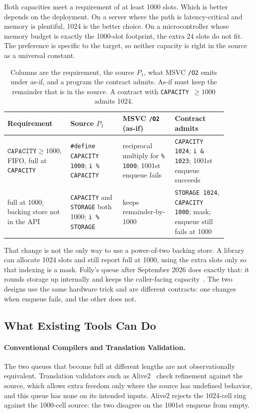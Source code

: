 Both capacities meet a requirement of at least 1000 slots. Which is better
depends on the deployment. On a server where the path is latency-critical and
memory is plentiful, 1024 is the better choice. On a microcontroller whose
memory budget is exactly the 1000-slot footprint, the extra 24 slots do not
fit. The preference is specific to the target, so neither capacity is right
in the source as a universal constant.

\begin{table}
\caption{Columns are the requirement, the source \(P_1\), what MSVC
\texttt{/O2} emits under as-if, and a program the contract admits. As-if
must keep the remainder that is in the source. A contract with
\texttt{CAPACITY}~\(\ge 1000\) admits 1024.}
\label{tab:motivating}
\scriptsize
\begin{tabular}{p{0.22\linewidth}p{0.22\linewidth}p{0.22\linewidth}p{0.22\linewidth}}
\toprule
Requirement & Source \(P_1\) & MSVC \texttt{/O2} (as-if) & Contract admits \\
\midrule
\(\texttt{CAPACITY} \ge 1000\), FIFO, full at \texttt{CAPACITY} &
\texttt{\#define CAPACITY 1000}; \texttt{i \% CAPACITY} &
reciprocal multiply for \texttt{\% 1000}; 1001st enqueue fails &
\texttt{CAPACITY 1024}; \texttt{i \& 1023}; 1001st enqueue succeeds \\
full at 1000; backing store not in the API &
\texttt{CAPACITY} and \texttt{STORAGE} both 1000; \texttt{i \% STORAGE} &
keeps remainder-by-1000 &
\texttt{STORAGE 1024}, \texttt{CAPACITY 1000}; mask; enqueue still fails at 1000 \\
\bottomrule
\end{tabular}
\end{table}

That change is not the only way to use a power-of-two backing store. A library
can allocate 1024 slots and still report full at 1000, using the extra slots
only so that indexing is a mask. Folly's queue after September 2026 does
exactly that: it rounds storage up internally and keeps the caller-facing
capacity~\cite{folly_pcq}. The two designs use the same hardware trick and are different contracts: one
changes when enqueue fails, and the other does not.

\subsection{What Existing Tools Can Do}
\label{sec:existing}

\paragraph{Conventional Compilers and Translation Validation.}
The two queues that become full at different lengths are not observationally
equivalent. Translation validators such as Alive2~\cite{lopes2021alive2} check
refinement against the source, which allows extra freedom only where the source
has undefined behavior, and this queue has none on its intended inputs.
Alive2 rejects the 1024-cell ring against the 1000-cell source: the two
disagree on the 1001st enqueue from empty.

